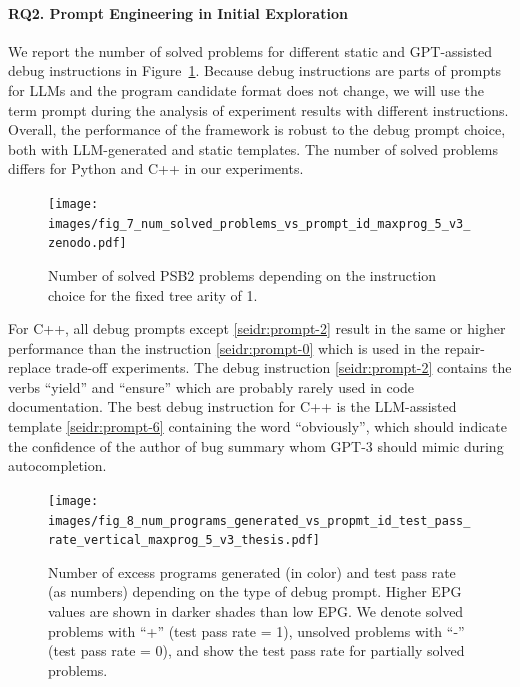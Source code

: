 \paragraph{RQ2. Prompt Engineering in Initial Exploration}
We report the number of solved problems for different static and GPT-assisted debug instructions in Figure~\ref{fig:seidr:solved-vs-prompt-id}. 
Because debug instructions are parts of prompts for LLMs and the program candidate format does not change, we will use the term prompt during the analysis of experiment results with different instructions.
Overall, the performance of the framework is robust to the debug prompt choice, both with LLM-generated and static templates. 
The number of solved problems differs for Python and C++ in our experiments.

\begin{figure}[htb]
  \centering
  \texttt{[image: images/fig\_7\_num\_solved\_problems\_vs\_prompt\_id\_maxprog\_5\_v3\_zenodo.pdf]}
  \caption{Number of solved PSB2 problems depending on the instruction choice for the fixed tree arity of 1. 
  }
  \label{fig:seidr:solved-vs-prompt-id}
  \vspace*{-2ex}
\end{figure}

For C++, all debug prompts except \ref{seidr:prompt-2} result in the same or higher performance than the instruction \ref{seidr:prompt-0} which is used in the repair-replace trade-off experiments. 
The debug instruction \ref{seidr:prompt-2} contains the verbs ``yield'' and ``ensure'' which are probably rarely used in code documentation. 
The best debug instruction for C++ is the LLM-assisted template \ref{seidr:prompt-6} containing the word ``obviously'', which should indicate the confidence of the author of bug summary whom GPT-3 should mimic during autocompletion.



\begin{figure}[H]
  \centering
  \texttt{[image: images/fig\_8\_num\_programs\_generated\_vs\_propmt\_id\_test\_pass\_rate\_vertical\_maxprog\_5\_v3\_thesis.pdf]}
  \caption{Number of excess programs generated (in color) and test pass rate (as numbers) depending on the type of debug prompt. Higher EPG values are shown in darker shades than low EPG. We denote solved problems with ``+'' (test pass rate = 1), unsolved problems with ``-'' (test pass rate = 0), and show the test pass rate for partially solved problems. }
  \label{fig:seidr:epg-prompt-test}
  \vspace*{-3ex}
\end{figure}

